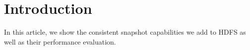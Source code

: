\section{Introduction}

In this article, we show the consistent snapshot capabilities we add to HDFS as well as their performance evaluation.
